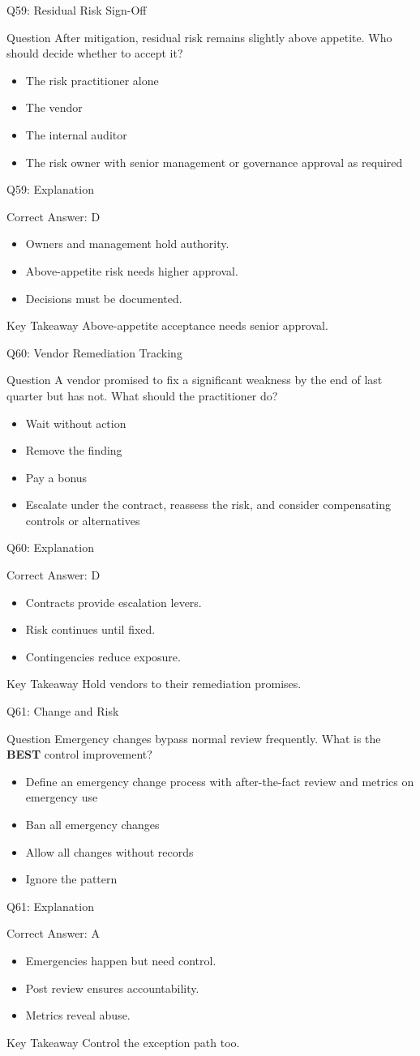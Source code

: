 \documentclass[aspectratio=169]{beamer}
\newcommand{\hq}[7]{%
	\begin{frame}{Q#1: #2}
		\begin{block}{Question}
			#3
		\end{block}
		\begin{itemize}
			#4
		\end{itemize}
	\end{frame}
	\begin{frame}{Q#1: Explanation}
		\begin{block}{Correct Answer: #5}
			\begin{itemize}
				#6
			\end{itemize}
		\end{block}
		\begin{alertblock}{Key Takeaway}
			#7
		\end{alertblock}
	\end{frame}
}
\begin{document}
	\hq{59}{Residual Risk Sign-Off}
	{After mitigation, residual risk remains slightly above appetite. Who should decide whether to accept it?}
	{\item[\textbf{(A)}] The risk practitioner alone
		\item[\textbf{(B)}] The vendor
		\item[\textbf{(C)}] The internal auditor
		\item[\textbf{(D)}] The risk owner with senior management or governance approval as required}
	{D}
	{\item Owners and management hold authority.
		\item Above-appetite risk needs higher approval.
		\item Decisions must be documented.}
	{Above-appetite acceptance needs senior approval.}
	
	\hq{60}{Vendor Remediation Tracking}
	{A vendor promised to fix a significant weakness by the end of last quarter but has not. What should the practitioner do?}
	{\item[\textbf{(A)}] Wait without action
		\item[\textbf{(B)}] Remove the finding
		\item[\textbf{(C)}] Pay a bonus
		\item[\textbf{(D)}] Escalate under the contract, reassess the risk, and consider compensating controls or alternatives}
	{D}
	{\item Contracts provide escalation levers.
		\item Risk continues until fixed.
		\item Contingencies reduce exposure.}
	{Hold vendors to their remediation promises.}
	
	\hq{61}{Change and Risk}
	{Emergency changes bypass normal review frequently. What is the \textbf{BEST} control improvement?}
	{\item[\textbf{(A)}] Define an emergency change process with after-the-fact review and metrics on emergency use
		\item[\textbf{(B)}] Ban all emergency changes
		\item[\textbf{(C)}] Allow all changes without records
		\item[\textbf{(D)}] Ignore the pattern}
	{A}
	{\item Emergencies happen but need control.
		\item Post review ensures accountability.
		\item Metrics reveal abuse.}
	{Control the exception path too.}
	
\end{document}
